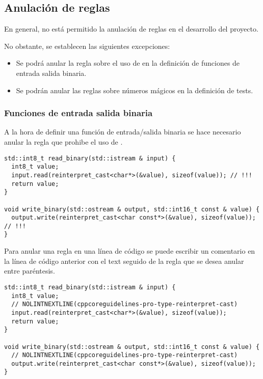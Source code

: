\subsection{Anulación de reglas}

En general, no está permitido la anulación de reglas en el desarrollo
del proyecto.

No obstante, se establecen las siguientes excepciones:
\begin{itemize}

\item Se podrá anular la regla sobre el uso de 
      en la definición de funciones de entrada salida binaria.

\item Se podrán anular las reglas sobre números mágicos 
      en la definición de tests.

\end{itemize}

\subsubsection{Funciones de entrada salida binaria}

A la hora de definir una función de entrada/salida binaria se hace necesario
anular la regla que prohibe el uso de .

\begin{lstlisting}
std::int8_t read_binary(std::istream & input) {
  int8_t value;
  input.read(reinterpret_cast<char*>(&value), sizeof(value)); // !!!
  return value;
}

void write_binary(std::ostream & output, std::int16_t const & value) {
  output.write(reinterpret_cast<char const*>(&value), sizeof(value)); // !!!
}
\end{lstlisting} 

Para anular una regla en una línea de código se puede escribir un comentario en
la línea de código anterior con el text  seguido de la
regla que se desea anular entre paréntesis.

\begin{lstlisting}
std::int8_t read_binary(std::istream & input) {
  int8_t value;
  // NOLINTNEXTLINE(cppcoreguidelines-pro-type-reinterpret-cast)
  input.read(reinterpret_cast<char*>(&value), sizeof(value));
  return value;
}

void write_binary(std::ostream & output, std::int16_t const & value) {
  // NOLINTNEXTLINE(cppcoreguidelines-pro-type-reinterpret-cast)
  output.write(reinterpret_cast<char const*>(&value), sizeof(value));
}
\end{lstlisting} 

